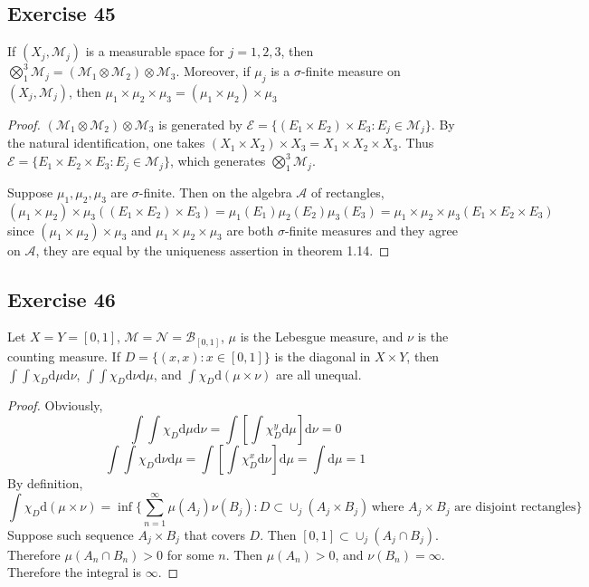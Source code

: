 \subsection*{Exercise 45}
If $(X_j,\mathcal{M}_j)$ is a measurable space for $j=1,2,3$, then $\bigotimes^3_1\mathcal{M}_j=(\mathcal{M}_1\otimes\mathcal{M}_2)\otimes\mathcal{M}_3$. Moreover, if $\mu_j$ is a $\sigma$-finite measure on $(X_j,\mathcal{M}_j)$, then $\mu_1\times\mu_2\times\mu_3=(\mu_1\times\mu_2)\times\mu_3$
\begin{proof}
    $(\mathcal{M}_1\otimes\mathcal{M}_2)\otimes\mathcal{M}_3$ is generated by $\mathcal{E}=\{(E_1\times E_2)\times E_3:E_j\in\mathcal{M}_j\}$. By the natural identification, one takes $(X_1\times X_2)\times X_3=X_1\times X_2\times X_3$. Thus
    $\mathcal{E}=\{E_1\times E_2\times E_3:E_j\in\mathcal{M}_j\}$, which generates $\bigotimes^3_1\mathcal{M}_j$.
    \par Suppose $\mu_1,\mu_2,\mu_3$ are $\sigma$-finite. Then on the algebra $\mathcal{A}$ of rectangles,
    $$
    (\mu_1\times\mu_2)\times\mu_3((E_1\times E_2)\times E_3)=\mu_1(E_1)\mu_2(E_2)\mu_3(E_3)=\mu_1\times\mu_2\times\mu_3(E_1\times E_2\times E_3)
    $$
    since $(\mu_1\times\mu_2)\times\mu_3$ and $\mu_1\times\mu_2\times\mu_3$ are both $\sigma$-finite measures and they agree on $\mathcal{A}$, they are equal by the uniqueness assertion in theorem 1.14.
\end{proof}
\subsection*{Exercise 46}
Let $X=Y=[0,1]$, $\mathcal{M}=\mathcal{N}=\mathcal{B}_{[0,1]}$, $\mu$ is the Lebesgue measure, and $\nu$ is the counting measure. If $D=\{(x,x):x\in[0,1]\}$ is the diagonal in $X\times Y$, then $\int\int\chi_D\mathrm{d}\mu\mathrm{d}\nu$, $\int\int\chi_D\mathrm{d}\nu\mathrm{d}\mu$, and $\int\chi_D\mathrm{d}(\mu\times\nu)$ are all unequal.
\begin{proof}
    Obviously,
    $$
    \int\int\chi_D\mathrm{d}\mu\mathrm{d}\nu=\int\left[\int\chi_D^y\mathrm{d}\mu\right]\mathrm{d}\nu=0
    $$
    $$
    \int\int\chi_D\mathrm{d}\nu\mathrm{d}\mu=\int\left[\int\chi_D^x\mathrm{d}\nu\right]\mathrm{d}\mu=\int\mathrm{d}\mu=1
    $$
    By definition,
    $$
    \int\chi_D\mathrm{d}(\mu\times\nu)=\inf\{\sum_{n=1}^\infty\mu(A_j)\nu(B_j):D\subset\cup_j(A_j\times B_j)\,\text{where $A_j\times B_j$ are disjoint rectangles}\}
    $$
    Suppose such sequence $A_j\times B_j$ that covers $D$. Then $[0,1]\subset\cup_j(A_j\cap B_j)$. Therefore $\mu(A_n\cap B_n)>0$ for some $n$. Then $\mu(A_n)>0$, and $\nu(B_n)=\infty$. Therefore the integral is $\infty$.
\end{proof}
